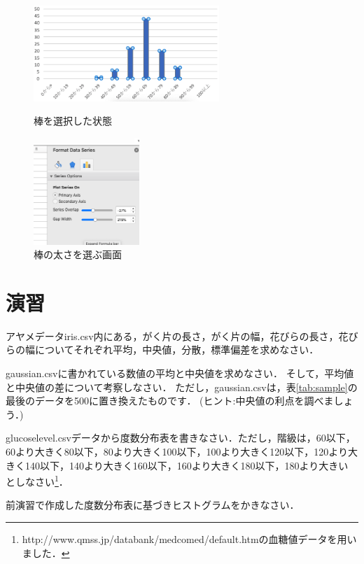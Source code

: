 \begin{figure}[htbp]
    \begin{minipage}{0.5\hsize}
        \centering
        \includegraphics[width=7cm]{chap1/select_bar_hist.png}
        \caption{棒を選択した状態}
        \label{fig:select_bar_hist}
    \end{minipage}
    \begin{minipage}{0.5\hsize}
        \centering
        \includegraphics[width=4cm]{chap1/select_width_hist.png}
        \caption{棒の太さを選ぶ画面}
        \label{fig:select_width_hist}
    \end{minipage}
\end{figure}


\section{演習}

\practice
アヤメデータiris.csv内にある，がく片の長さ，がく片の幅，花びらの長さ，花びらの幅についてそれぞれ平均，中央値，分散，標準偏差を求めなさい．

\practice
gaussian.csvに書かれている数値の平均と中央値を求めなさい．
そして，平均値と中央値の差について考察しなさい．
ただし，gaussian.csvは，表\ref{tab:sample}の最後のデータを500に置き換えたものです．
(ヒント:中央値の利点を調べましょう．)

\practice
glucoselevel.csvデータから度数分布表を書きなさい．ただし，階級は，60以下，60より大きく80以下，80より大きく100以下，100より大きく120以下，120より大きく140以下，140より大きく160以下，160より大きく180以下，180より大きい としなさい\footnote{http://www.qmss.jp/databank/medcomed/default.htmの血糖値データを用いました．}．

\practice
 前演習で作成した度数分布表に基づきヒストグラムをかきなさい．

